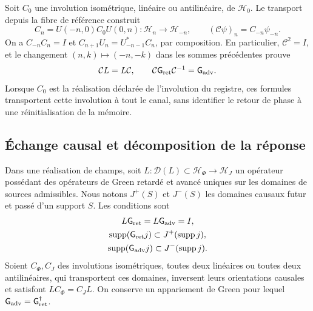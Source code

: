Soit \(C_0\) une involution isométrique, linéaire ou antilinéaire, de \(\mathcal H_0\). Le transport depuis la fibre de référence construit
\[
 C_n=U(-n,0)C_0U(0,n):\mathcal H_n\longrightarrow\mathcal H_{-n},
 \qquad (\mathcal C\psi)_n=C_{-n}\psi_{-n}.
\]
On a \(C_{-n}C_n=I\) et \(C_{n+1}U_n=U_{-n-1}^*C_n\), par composition. En particulier, \(\mathcal C^2=I\), et le changement \((n,k)\mapsto(-n,-k)\) dans les sommes précédentes prouve
\begin{equation}
 \mathcal C L=L\mathcal C,\qquad
 \mathcal C \mathsf{G}_{\rm ret}\mathcal C^{-1}=\mathsf{G}_{\rm adv}.
 \label{vii:eq:intercambio-green-cronologico}
\end{equation}
Lorsque \(C_0\) est la réalisation déclarée de l'involution du registre, ces formules transportent cette involution à tout le canal, sans identifier le retour de phase à une réinitialisation de la mémoire.

\subsection{Échange causal et décomposition de la réponse}
\label{vii:subsec:green-realizacion-campos}

Dans une réalisation de champs, soit
\(L:\mathcal D(L)\subset\mathcal H_\Phi\to\mathcal H_J\)
un opérateur possédant des opérateurs de Green retardé et avancé uniques sur les domaines de
sources admissibles. Nous notons \(J^+(S)\) et \(J^-(S)\) les
domaines causaux futur et passé d'un support \(S\). Les conditions sont
\[
 \begin{gathered}
 L\mathsf{G}_{\rm ret}=L\mathsf{G}_{\rm adv}=I,\\
 \operatorname{supp}(\mathsf{G}_{\rm ret}j)\subset J^+(\operatorname{supp}j),\\
 \operatorname{supp}(\mathsf{G}_{\rm adv}j)\subset J^-(\operatorname{supp}j).
 \end{gathered}
\]
Soient \(C_\Phi,C_J\) des involutions isométriques, toutes deux linéaires ou toutes deux
antilinéaires, qui transportent ces domaines,
inversent leurs orientations causales et satisfont
\(LC_\Phi=C_JL\). On conserve un appariement de Green pour lequel
\(\mathsf{G}_{\rm adv}=\mathsf{G}_{\rm ret}^{\dagger}\).

